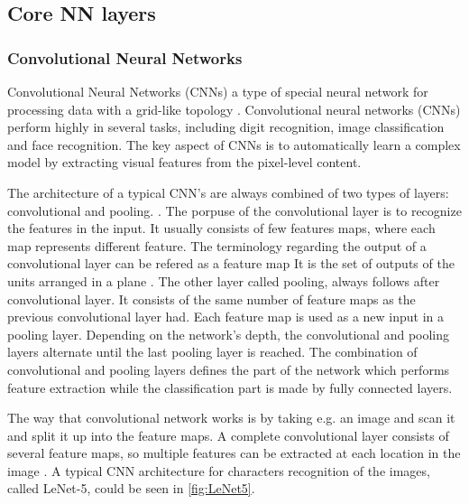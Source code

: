 \subsection{Core NN layers}
\subsubsection{Convolutional Neural Networks}
Convolutional Neural Networks (CNNs) a type of special neural network for processing data with a grid-like topology \citep{Goodfellow2016}. Convolutional neural networks (CNNs) perform highly in several tasks, including digit recognition, image classification and face recognition. The key aspect of CNNs is to automatically learn a complex model by extracting visual features from the pixel-level content.\citep{Acquarelli2017,LeCun1998}

The architecture of a typical CNN’s are always combined of two types of layers: convolutional and pooling. \citep{Goodfellow2016, LeCun2015}. The porpuse of the convolutional layer is to recognize the features in the input. It usually consists of few features maps, where each map represents different feature. The terminology regarding the output of a convolutional layer can be refered as a feature map \citep{Goodfellow2016,LeCun1998} It is the set of outputs of the units arranged in a plane \citep{LeCun1998}. The other layer called pooling, always follows after convolutional layer. It consists of the same number of feature maps as the previous convolutional layer had. Each feature map is used as a new input in a pooling layer. Depending on the network's depth, the convolutional and pooling layers alternate until the last pooling layer is reached. The combination of convolutional and pooling layers defines the part of the network which performs feature extraction while the classification part is made by fully connected layers. 

The way that convolutional network works is by taking e.g. an image and scan it and split it up into the feature maps. A complete convolutional layer consists of several feature maps, so multiple features can be extracted at each location in the image \citep{LeCun1998}. A typical CNN architecture for characters recognition of the images, called LeNet-5, could be seen in \autoref{fig:LeNet5}.


%
 

